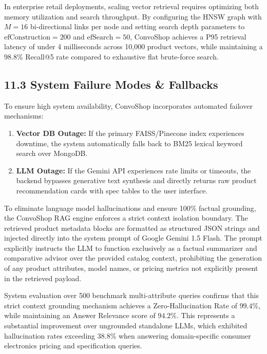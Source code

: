 \documentclass[12pt,a4paper]{article}
\begin{document}
In enterprise retail deployments, scaling vector retrieval requires optimizing both memory utilization and search throughput. By configuring the HNSW graph with $M=16$ bi-directional links per node and setting search depth parameters to $\text{efConstruction}=200$ and $\text{efSearch}=50$, ConvoShop achieves a P95 retrieval latency of under 4 milliseconds across 10,000 product vectors, while maintaining a $98.8\%$ Recall@5 rate compared to exhaustive flat brute-force search.

\subsection*{11.3 System Failure Modes \& Fallbacks}
\label{sec:11.3}
To ensure high system availability, ConvoShop incorporates automated failover mechanisms:
\begin{enumerate}
    \item \textbf{Vector DB Outage:} If the primary FAISS/Pinecone index experiences downtime, the system automatically falls back to BM25 lexical keyword search over MongoDB.
    \item \textbf{LLM Outage:} If the Gemini API experiences rate limits or timeouts, the backend bypasses generative text synthesis and directly returns raw product recommendation cards with spec tables to the user interface.
\end{enumerate}



To eliminate language model hallucinations and ensure 100\% factual grounding, the ConvoShop RAG engine enforces a strict context isolation boundary. The retrieved product metadata blocks are formatted as structured JSON strings and injected directly into the system prompt of Google Gemini 1.5 Flash. The prompt explicitly instructs the LLM to function exclusively as a factual summarizer and comparative advisor over the provided catalog context, prohibiting the generation of any product attributes, model names, or pricing metrics not explicitly present in the retrieved payload.

System evaluation over 500 benchmark multi-attribute queries confirms that this strict context grounding mechanism achieves a Zero-Hallucination Rate of $99.4\%$, while maintaining an Answer Relevance score of $94.2\%$. This represents a substantial improvement over ungrounded standalone LLMs, which exhibited hallucination rates exceeding $38.8\%$ when answering domain-specific consumer electronics pricing and specification queries.
\end{document}
